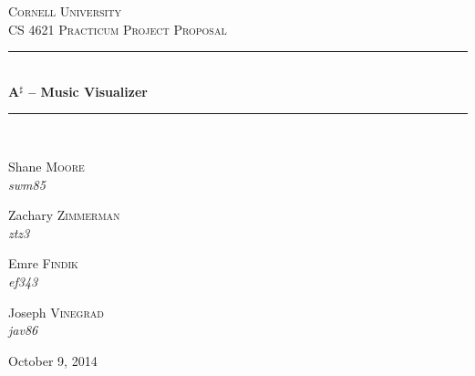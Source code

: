 \documentclass{article}
\newcommand{\HRule}{\rule{\linewidth}{0.5mm}}
\begin{document}
\begin{titlepage}
\begin{center}

\textsc{\LARGE Cornell University}\\[1.5cm]

\textsc{\Large CS 4621 Practicum Project Proposal}\\[0.5cm]

\HRule \\[0.4cm]
{ \huge \bfseries A$^\sharp$ -- Music Visualizer \\[0.4cm] }

\HRule \\[1.5cm]

\begin{minipage}{0.4\textwidth}
\begin{flushleft} \large
Shane \textsc{Moore} \\
\emph{swm85}
\end{flushleft}
\end{minipage}
\begin{minipage}{0.4\textwidth}
\begin{flushright} \large
Zachary \textsc{Zimmerman} \\
\emph{ztz3}
\end{flushright}
\end{minipage}
\par\vspace{0.5cm}
\begin{minipage}{0.4\textwidth}
\begin{flushleft} \large
Emre \textsc{Findik} \\
\emph{ef343}
\end{flushleft}
\end{minipage}
\begin{minipage}{0.4\textwidth}
\begin{flushright} \large
Joseph \textsc{Vinegrad} \\
\emph{jav86}
\end{flushright}
\end{minipage}

\vfill

{\large October 9, 2014}

\end{center}

\end{titlepage}

\end{document}
